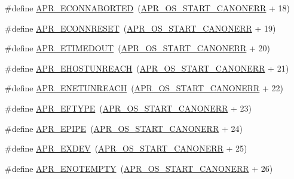 \begin{DoxyCompactItemize}
\item 
\#define \hyperlink{group__APR__Error_ga9458da18e0ee46a5d37c9cdfdc43efd2}{A\+P\+R\+\_\+\+E\+C\+O\+N\+N\+A\+B\+O\+R\+T\+ED}~(\hyperlink{group__apr__errno_ga7bca957c11b80b31cb54b0d2cbe9e025}{A\+P\+R\+\_\+\+O\+S\+\_\+\+S\+T\+A\+R\+T\+\_\+\+C\+A\+N\+O\+N\+E\+RR} + 18)
\item 
\#define \hyperlink{group__APR__Error_ga264bfe2056e917728e9ed060b58869c2}{A\+P\+R\+\_\+\+E\+C\+O\+N\+N\+R\+E\+S\+ET}~(\hyperlink{group__apr__errno_ga7bca957c11b80b31cb54b0d2cbe9e025}{A\+P\+R\+\_\+\+O\+S\+\_\+\+S\+T\+A\+R\+T\+\_\+\+C\+A\+N\+O\+N\+E\+RR} + 19)
\item 
\#define \hyperlink{group__APR__Error_ga6aeccbe9accb34f0adc1cb1ab9a82a8d}{A\+P\+R\+\_\+\+E\+T\+I\+M\+E\+D\+O\+UT}~(\hyperlink{group__apr__errno_ga7bca957c11b80b31cb54b0d2cbe9e025}{A\+P\+R\+\_\+\+O\+S\+\_\+\+S\+T\+A\+R\+T\+\_\+\+C\+A\+N\+O\+N\+E\+RR} + 20)
\item 
\#define \hyperlink{group__APR__Error_ga489b0c02fa7cf33ed6d698d385661f86}{A\+P\+R\+\_\+\+E\+H\+O\+S\+T\+U\+N\+R\+E\+A\+CH}~(\hyperlink{group__apr__errno_ga7bca957c11b80b31cb54b0d2cbe9e025}{A\+P\+R\+\_\+\+O\+S\+\_\+\+S\+T\+A\+R\+T\+\_\+\+C\+A\+N\+O\+N\+E\+RR} + 21)
\item 
\#define \hyperlink{group__APR__Error_gab9b7124a88817d1b69cdef059f7dc689}{A\+P\+R\+\_\+\+E\+N\+E\+T\+U\+N\+R\+E\+A\+CH}~(\hyperlink{group__apr__errno_ga7bca957c11b80b31cb54b0d2cbe9e025}{A\+P\+R\+\_\+\+O\+S\+\_\+\+S\+T\+A\+R\+T\+\_\+\+C\+A\+N\+O\+N\+E\+RR} + 22)
\item 
\#define \hyperlink{group__APR__Error_gac358701354d03c37e3f0de12ed6d9afc}{A\+P\+R\+\_\+\+E\+F\+T\+Y\+PE}~(\hyperlink{group__apr__errno_ga7bca957c11b80b31cb54b0d2cbe9e025}{A\+P\+R\+\_\+\+O\+S\+\_\+\+S\+T\+A\+R\+T\+\_\+\+C\+A\+N\+O\+N\+E\+RR} + 23)
\item 
\#define \hyperlink{group__APR__Error_gae985330e30e374714ff1742485597f5d}{A\+P\+R\+\_\+\+E\+P\+I\+PE}~(\hyperlink{group__apr__errno_ga7bca957c11b80b31cb54b0d2cbe9e025}{A\+P\+R\+\_\+\+O\+S\+\_\+\+S\+T\+A\+R\+T\+\_\+\+C\+A\+N\+O\+N\+E\+RR} + 24)
\item 
\#define \hyperlink{group__APR__Error_ga0562023bd8ebe580b9bbb9f7b04d3f5d}{A\+P\+R\+\_\+\+E\+X\+D\+EV}~(\hyperlink{group__apr__errno_ga7bca957c11b80b31cb54b0d2cbe9e025}{A\+P\+R\+\_\+\+O\+S\+\_\+\+S\+T\+A\+R\+T\+\_\+\+C\+A\+N\+O\+N\+E\+RR} + 25)
\item 
\#define \hyperlink{group__APR__Error_ga01d9259eccdf0576f58b89c4ad8ca4eb}{A\+P\+R\+\_\+\+E\+N\+O\+T\+E\+M\+P\+TY}~(\hyperlink{group__apr__errno_ga7bca957c11b80b31cb54b0d2cbe9e025}{A\+P\+R\+\_\+\+O\+S\+\_\+\+S\+T\+A\+R\+T\+\_\+\+C\+A\+N\+O\+N\+E\+RR} + 26)

\end{DoxyCompactItemize}
